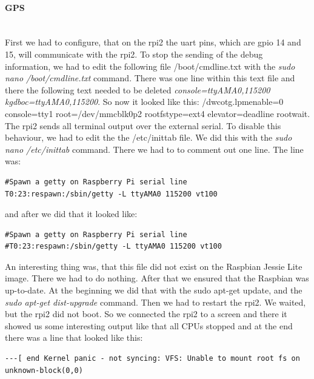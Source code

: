 \paragraph{GPS} \mbox{}\\
First we had to configure, that on the \gls{rpi2} the \gls{uart} pins, which are \gls{gpio} 14 and 15, will communicate with the \gls{rpi2}.\newline
To stop the sending of the debug information, we had to edit the following file /boot/cmdline.txt with the \textit{sudo nano /boot/cmdline.txt} command.\newline
There was one line within this text file and there the following text needed to be deleted \textit{console=ttyAMA0,115200 kgdboc=ttyAMA0,115200}.\newline
So now it looked like this: /dwc\textunderscore otg.lpm\textunderscore enable=0 console=tty1 root=/dev/mmcblk0p2 rootfstype=ext4 elevator=deadline rootwait.\newline
The \gls{rpi2} sends all terminal output over the external serial. To disable this behaviour, we had to edit the the /etc/inittab file. We did this with the \textit{sudo nano /etc/inittab} command.\newline
There we had to to comment out one line. The line was:
\begin{verbatim}
#Spawn a getty on Raspberry Pi serial line
T0:23:respawn:/sbin/getty -L ttyAMA0 115200 vt100
\end{verbatim}
and after we did that it looked like:
\begin{verbatim}
#Spawn a getty on Raspberry Pi serial line
#T0:23:respawn:/sbin/getty -L ttyAMA0 115200 vt100
\end{verbatim}
An interesting thing was, that this file did not exist on the Raspbian Jessie Lite image. There we had to do nothing.\newline
After that we ensured that the Raspbian was up-to-date. At the beginning we did that with the sudo apt-get update, and the \textit{sudo apt-get dist-upgrade} command. Then we had to restart the \gls{rpi2}. We waited, but the \gls{rpi2} did not boot. So we connected the \gls{rpi2} to a screen and there it showed us some interesting output like that all CPUs stopped and at the end there was a line that looked like this: \newline
\begin{verbatim}
---[ end Kernel panic - not syncing: VFS: Unable to mount root fs on unknown-block(0,0)
\end{verbatim}
